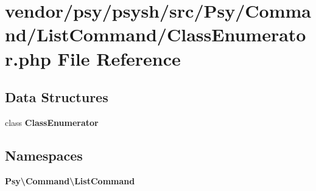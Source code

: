 \section{vendor/psy/psysh/src/\+Psy/\+Command/\+List\+Command/\+Class\+Enumerator.php File Reference}
\label{_class_enumerator_8php}
\subsection*{Data Structures}
\begin{DoxyCompactItemize}
\item 
class {\bf Class\+Enumerator}
\end{DoxyCompactItemize}
\subsection*{Namespaces}
\begin{DoxyCompactItemize}
\item 
 {\bf Psy\textbackslash{}\+Command\textbackslash{}\+List\+Command}
\end{DoxyCompactItemize}
